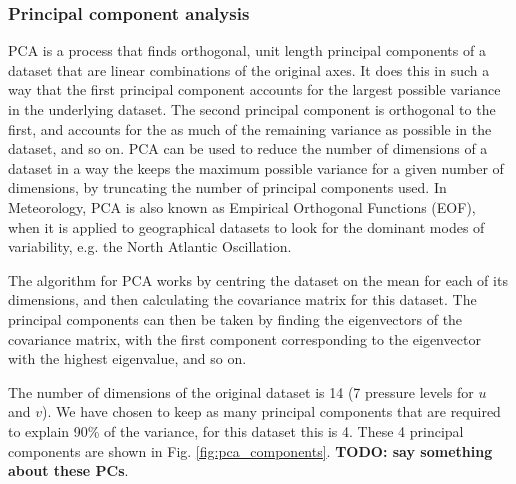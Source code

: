 \documentclass{article}
\newcommand\todo[1]{\textbf{TODO: #1}}
\begin{document}
\subsubsection{Principal component analysis}

PCA is a process that finds orthogonal, unit length principal components of a dataset that are linear combinations of the original axes. It does this in such a way that the first principal component accounts for the largest possible variance in the underlying dataset. The second principal component is orthogonal to the first, and accounts for the as much of the remaining variance as possible in the dataset, and so on. PCA can be used to reduce the number of dimensions of a dataset in a way the keeps the maximum possible variance for a given number of dimensions, by truncating the number of principal components used. In Meteorology, PCA is also known as Empirical Orthogonal Functions (EOF), when it is applied to geographical datasets to look for the dominant modes of variability, e.g. the North Atlantic Oscillation.

The algorithm for PCA works by centring the dataset on the mean for each of its dimensions, and then calculating the covariance matrix for this dataset. The principal components can then be taken by finding the eigenvectors of the covariance matrix, with the first component corresponding to the eigenvector with the highest eigenvalue, and so on. 

The number of dimensions of the original dataset is 14 (7 pressure levels for $u$ and $v$). We have chosen to keep as many principal components that are required to explain 90\% of the variance, for this dataset this is 4. These 4 principal components are shown in Fig. \ref{fig:pca_components}. \todo{say something about these PCs}.
\end{document}
